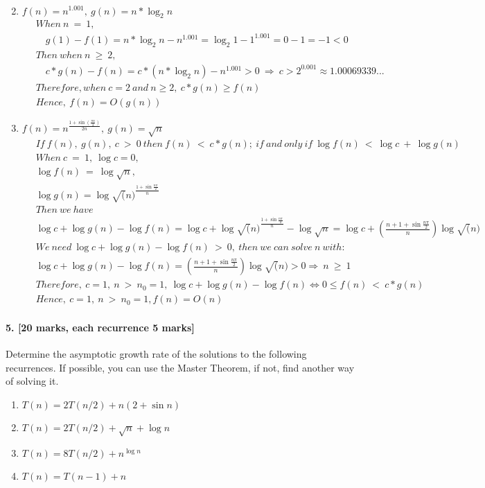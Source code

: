 \documentclass[a4paper]{scrartcl}
\begin{document}
\begin{enumerate}[label=(\alph*)]
\begin{align*}
  \end{align*}
  \item $f(n)=n^{1.001},\ g(n)=n*\log_2{n}$
  \begin{align*}
  &\ When\ n\ =\ 1,\\ &\ \quad g(1)-f(1)=n*\log_2{n}-n^{1.001}=\log_2{1}-1^{1.001}=0-1=-1<0 \\&\
  Then\ when\ n\ \geq\ 2, \\ &\ \quad
  c*g(n)-f(n)= c*(n*\log_2{n})-n^{1.001}>0\ \Rightarrow\ c > 2^{0.001} \approx 1.00069339...\\&\
  Therefore, when\ c=2\ and\ n \geq 2,\ c*g(n) \geq f(n)\\&\
  Hence,\ f(n) = O(g(n))
  \end{align*}
  \item $f(n)=n^{\frac{1+\sin(\frac{\pi n}{2})}{2n}},\ g(n)=\sqrt{n}$
  \begin{align*}
  &\ If\ f(n),\ g(n),\ c\ >\ 0\ then\ f(n)\ <\ c*g(n);\ if\ and\ only\ if\ \log{f(n)}\ <\ \log{c}\ +\ \log{g(n)}\\&\
  When\ c\ =\ 1,\ \log{c} = 0,\\&\
  \log{f(n)}\ =\ \log{\sqrt{n}},\\&\ \log{g(n)}=\log{\sqrt(n)}^{\frac{1+\sin{\frac{n\pi}{2}}}{n}}\\&\
  Then\ we\ have\\&\
  \log{c}+\log{g(n)}-\log{f(n)}=\log{c}+\log{\sqrt(n)}^{\frac{1+\sin{\frac{n\pi}{2}}}{n}}-\log{\sqrt{n}}=\log{c}+(\frac{n+1+\sin{\frac{n\pi}{2}}}{n})\log{\sqrt(n)}\\&\
  We\ need\ \log{c}+\log{g(n)}-\log{f(n)}\ >\ 0,\ then\ we\ can\ solve\ n\ with:\\ &\
  \log{c}+\log{g(n)}-\log{f(n)}=(\frac{n+1+\sin{\frac{n\pi}{2}}}{n})\log{\sqrt(n)}>0\Rightarrow\ n\ \geq\ 1 \\&\
  Therefore,\ c=1,\ n\ >\ n_0=1,\ \log{c}+\log{g(n)}-\log{f(n)} \iff 0 \leq f(n)\ <\ c*g(n)\\&\
  Hence, \ c=1,\ n\ >\ n_0=1, f(n)=O(n)
  \end{align*}
\end{enumerate}
\paragraph{5. [20 marks, each recurrence 5 marks]}
\label{sec:Question 5}
Determine the asymptotic growth rate of the solutions to the following recurrences. If possible, you can use the Master Theorem, if not, find another way of solving it.
\begin{enumerate}[label=(\alph*)]
  \item $T (n) = 2T (n/2) + n(2 + \sin{n})$
  \item $T (n) = 2T (n/2) + \sqrt{n} + \log{n}$
  \item $T (n) = 8T (n/2) + n^{\log{n}}$
  \item $T (n) = T (n − 1) + n$
\end{enumerate}
\end{document}
